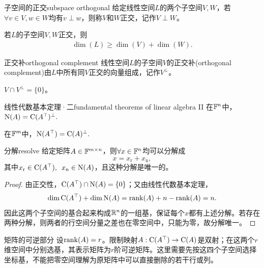 \begin{definition}{子空间的正交}{subspace orthogonal}
	给定线性空间$L$的两个子空间$V,W$，若$\forall v \in V,w \in W$均有$v \perp w$，则称$V$和$W$正交，记作$V \perp W$。
\end{definition}
\begin{corollary}
	若$L$的子空间$V,W$正交，则
	\begin{align}
		\dim(L) \geqslant \dim(V) + \dim(W).
	\end{align}
\end{corollary}
\begin{definition}{正交补}{orthogonal complement}
	线性空间$L$的子空间$V$的正交补(orthogonal complement)由$L$中所有同$V$正交的向量组成，记作$V^\perp$。
\end{definition}
\begin{corollary}
	$V \cap V^\perp = \{0\}$。
\end{corollary}
\begin{theorem}{线性代数基本定理·二}{fundamental theorems of linear algebra II}
	在$\mathbb{F}^n$中，$\operatorname{N}(A) = \operatorname{C}(A^\top)^\perp.$

	在$\mathbb{F}^m$中，$\operatorname{N}(A^\top) = \operatorname{C}(A)^\perp.$
\end{theorem}
\begin{theorem}{分解}{resolve}
给定矩阵$A \in \mathbb{F}^{m\times n}$，则$\forall x \in \mathbb{F}^n$均可以分解成
\begin{equation}\label{eq:la-row-null-decomposition}
	x = x_\mathrm r + x_\mathrm n,
\end{equation}
其中$x_\mathrm r \in \operatorname{C}(A^\top),\enspace x_\mathrm n \in \operatorname{N}(A)$，且这种分解是唯一的。
\end{theorem}
\begin{proof}
	由正交性，$\operatorname{C}(A^\top) \cap \operatorname{N}(A) = \{0\}$；又由线性代数基本定理，
	\[
		\dim\operatorname{C}(A^\top) + \dim\operatorname{N}(A) = \operatorname{rank}(A) + n - \operatorname{rank}(A) = n.
	\]
	因此这两个子空间的基合起来构成$\mathbb{R}^n$的一组基，保证每个$x$都有上述分解。若存在两种分解，则两者的行空间分量之差也在零空间中，只能为零，故分解唯一。
\end{proof}
\begin{theorem}
	{矩阵的可逆部分}{}
	设$\operatorname{rank}(A) = r$。限制映射$A:\operatorname{C}(A^\top) \to \operatorname{C}(A)$是双射；在这两个$r$维空间中分别选基，其表示矩阵为$r$阶可逆矩阵。这里需要先按这四个子空间选择坐标基，不能把零空间理解为原矩阵中可以直接删除的若干行或列。
\end{theorem}
\begin{notecaptionblock}
\end{notecaptionblock}
